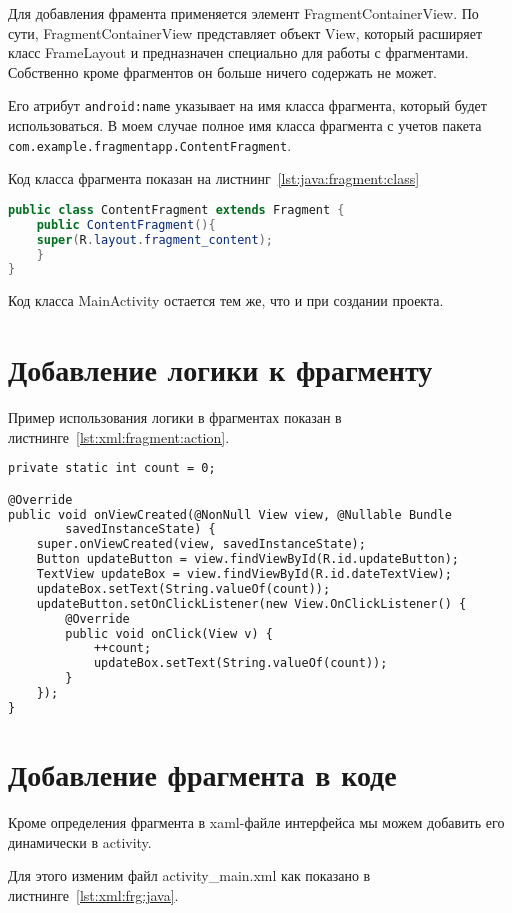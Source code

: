 Для добавления фрамента применяется элемент FragmentContainerView. По
сути, FragmentContainerView представляет объект View, который расширяет
класс FrameLayout и предназначен специально для работы с фрагментами.
Собственно кроме фрагментов он больше ничего содержать не может.\par
Его атрибут \texttt{android:name} указывает на имя класса фрагмента, который
будет использоваться. В моем случае полное имя класса фрагмента с учетов
пакета \texttt{com.example.fragmentapp.ContentFragment}.\par
Код класса фрагмента показан на листнинг~\ref{lst:java:fragment:class}

\begin{lstlisting}[language=Java
	, caption=\leftline{}
	, label=lst:java:fragment:class
	]
public class ContentFragment extends Fragment {
	public ContentFragment(){
	super(R.layout.fragment_content);
	}
}
\end{lstlisting}

Код класса MainActivity остается тем же, что и при создании проекта.

\section{Добавление логики к фрагменту}
Пример использования логики в фрагментах показан
в листнинге~\ref{lst:xml:fragment:action}.

\begin{lstlisting}[language=XML
	, caption=\leftline{}
	, label=lst:xml:fragment:action
	]
private static int count = 0;

@Override
public void onViewCreated(@NonNull View view, @Nullable Bundle
		savedInstanceState) {
	super.onViewCreated(view, savedInstanceState);
	Button updateButton = view.findViewById(R.id.updateButton);
	TextView updateBox = view.findViewById(R.id.dateTextView);
	updateBox.setText(String.valueOf(count));
	updateButton.setOnClickListener(new View.OnClickListener() {
		@Override
		public void onClick(View v) {
			++count;
			updateBox.setText(String.valueOf(count));
		}
	});
}
\end{lstlisting}

\section{Добавление фрагмента в коде}
Кроме определения фрагмента в xaml-файле интерфейса мы можем добавить
его динамически в activity.\par
Для этого изменим файл activity\_main.xml как показано в
листнинге~\ref{lst:xml:frg:java}.

